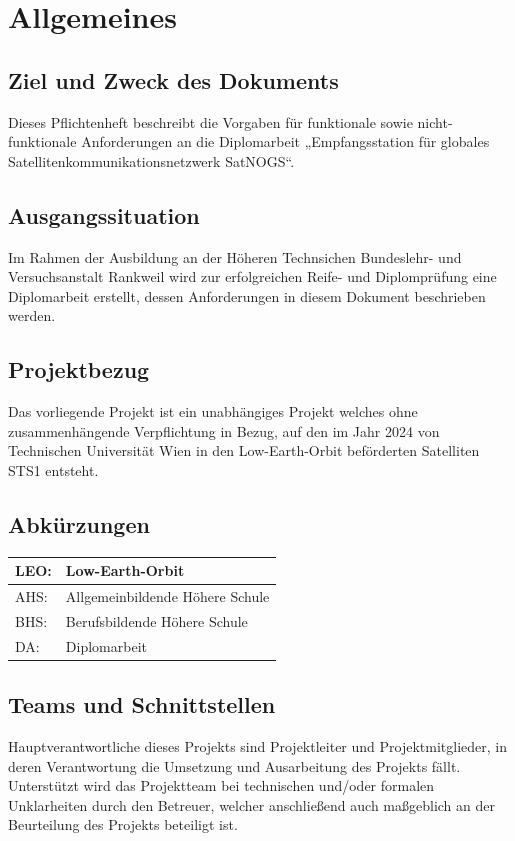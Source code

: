 \section{Allgemeines}
\subsection{Ziel und Zweck des Dokuments}
Dieses Pflichtenheft beschreibt die Vorgaben für funktionale sowie nicht-funktionale Anforderungen 
an die Diplomarbeit „Empfangsstation für globales Satellitenkommunikationsnetzwerk SatNOGS“. 

\subsection{Ausgangssituation}
Im Rahmen der Ausbildung an der Höheren Technsichen Bundeslehr- und Versuchsanstalt Rankweil 
wird zur erfolgreichen Reife- und Diplomprüfung eine Diplomarbeit erstellt, dessen Anforderungen in 
diesem Dokument beschrieben werden. 

\subsection{Projektbezug}
Das vorliegende Projekt ist ein unabhängiges Projekt welches ohne zusammenhängende Verpflichtung 
in Bezug, auf den im Jahr 2024 von Technischen Universität Wien in den Low-Earth-Orbit beförderten 
Satelliten STS1 entsteht. 

\subsection{Abkürzungen}
\begin{tabular}{ll}
	\hline
	LEO: & Low-Earth-Orbit \\
	\hline
	AHS: & Allgemeinbildende Höhere Schule \\
	\hline
	BHS: & Berufsbildende Höhere Schule \\
	\hline
	DA: & Diplomarbeit \\
	\hline
\end{tabular}

\subsection{Teams und Schnittstellen}
Hauptverantwortliche dieses Projekts sind Projektleiter und Projektmitglieder, in deren 
Verantwortung die Umsetzung und Ausarbeitung des Projekts fällt. Unterstützt wird das Projektteam 
bei technischen und/oder formalen Unklarheiten durch den Betreuer, welcher anschließend auch 
maßgeblich an der Beurteilung des Projekts beteiligt ist.

